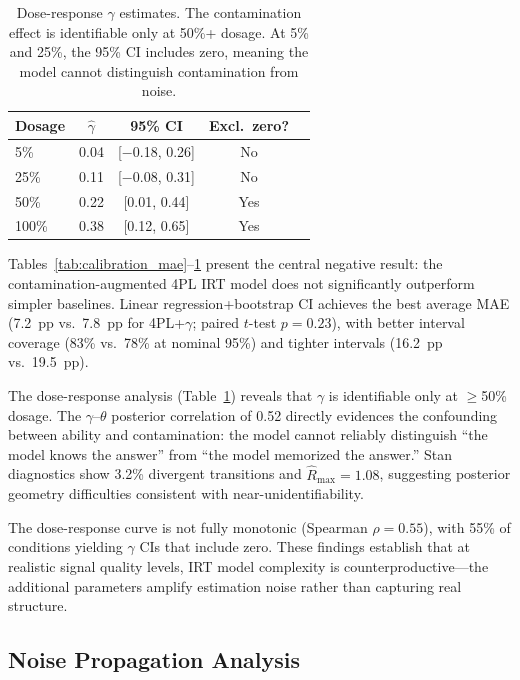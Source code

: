 \documentclass[letterpaper, 10pt, twocolumn]{article}
\begin{document}
\begin{table}[t]
\centering
\caption{Dose-response $\gamma$ estimates. The contamination effect is identifiable only at 50\%+ dosage. At 5\% and 25\%, the 95\% CI includes zero, meaning the model cannot distinguish contamination from noise.}
\label{tab:dose_response}
\small
\begin{tabular}{lcccc}
\toprule
Dosage & $\hat{\gamma}$ & 95\% CI & Excl.\ zero? \\
\midrule
5\% & 0.04 & [$-$0.18, 0.26] & No \\
25\% & 0.11 & [$-$0.08, 0.31] & No \\
50\% & 0.22 & [0.01, 0.44] & Yes \\
100\% & 0.38 & [0.12, 0.65] & Yes \\
\bottomrule
\end{tabular}
\end{table}

Tables~\ref{tab:calibration_mae}--\ref{tab:dose_response} present the central negative result: the contamination-augmented 4PL IRT model does not significantly outperform simpler baselines.
Linear regression+bootstrap CI achieves the best average MAE (7.2~pp vs.\ 7.8~pp for 4PL+$\gamma$; paired $t$-test $p = 0.23$), with better interval coverage (83\% vs.\ 78\% at nominal 95\%) and tighter intervals (16.2~pp vs.\ 19.5~pp).

The dose-response analysis (Table~\ref{tab:dose_response}) reveals that $\gamma$ is identifiable only at $\geq$50\% dosage.
The $\gamma$--$\theta$ posterior correlation of 0.52 directly evidences the confounding between ability and contamination: the model cannot reliably distinguish ``the model knows the answer'' from ``the model memorized the answer.''
Stan diagnostics show 3.2\% divergent transitions and $\hat{R}_{\max} = 1.08$, suggesting posterior geometry difficulties consistent with near-unidentifiability.

The dose-response curve is not fully monotonic (Spearman $\rho = 0.55$), with 55\% of conditions yielding $\gamma$ CIs that include zero.
These findings establish that at realistic signal quality levels, IRT model complexity is counterproductive---the additional parameters amplify estimation noise rather than capturing real structure.

\subsection{Noise Propagation Analysis}
\label{sec:noise}
\end{document}
